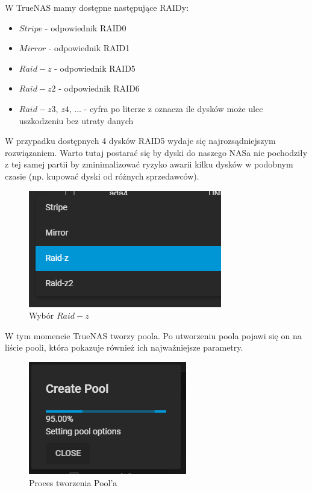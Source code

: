 \documentclass[12pt,a4paper]{article}
\newcommand{\<}{\langle}
\renewcommand{\>}{\rangle}
\theoremstyle{definition}
\begin{document}
W TrueNAS mamy dostępne następujące RAIDy:
\begin{itemize}
    \item $Stripe$ - odpowiednik RAID0
    \item $Mirror$ - odpowiednik RAID1
    \item $Raid-z$ - odpowiednik RAID5
    \item $Raid-z2$ - odpowiednik RAID6
    \item $Raid-z3$, $z4$, ... - cyfra po literze z oznacza ile dysków może ulec uszkodzeniu bez utraty danych
\end{itemize}

W przypadku dostępnych 4 dysków RAID5 wydaje się najrozsądniejszym rozwiązaniem. Warto tutaj postarać się by dyski do naszego NASa nie pochodziły z tej samej partii by zminimalizować ryzyko awarii kilku dysków w podobnym czasie (np. kupować dyski od różnych sprzedawców).

\begin{figure}[H]
    \centering
    \includegraphics{img/ss_truenas/21.png}
    \caption{Wybór $Raid-z$}
    \label{pool_raidz}
\end{figure}

W tym momencie TrueNAS tworzy poola. Po utworzeniu poola pojawi się on na liście pooli, która pokazuje również ich najważniejsze parametry.

\begin{figure}[H]
    \centering
    \includegraphics{img/ss_truenas/24.png}
    \caption{Proces tworzenia Pool'a}
    \label{pool_creating_progress}
\end{figure}
\end{document}

